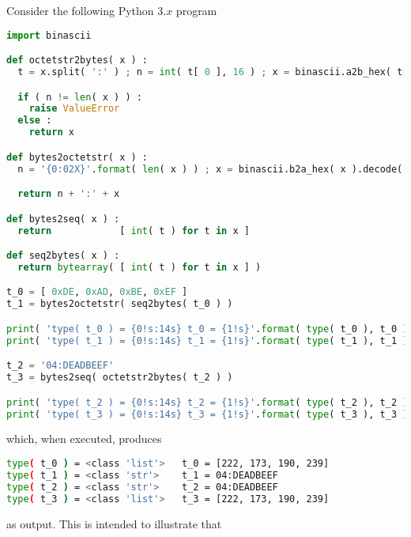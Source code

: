 Consider the following Python $3.x$ program

\begin{lstlisting}[language={Python},frame={single},basicstyle={\ttfamily\small}]
import binascii

def octetstr2bytes( x ) :
  t = x.split( ':' ) ; n = int( t[ 0 ], 16 ) ; x = binascii.a2b_hex( t[ 1 ] )

  if ( n != len( x ) ) :
    raise ValueError
  else :
    return x

def bytes2octetstr( x ) :
  n = '{0:02X}'.format( len( x ) ) ; x = binascii.b2a_hex( x ).decode( 'ascii' ).upper()

  return n + ':' + x

def bytes2seq( x ) :
  return            [ int( t ) for t in x ]

def seq2bytes( x ) :
  return bytearray( [ int( t ) for t in x ] )

t_0 = [ 0xDE, 0xAD, 0xBE, 0xEF ]
t_1 = bytes2octetstr( seq2bytes( t_0 ) )

print( 'type( t_0 ) = {0!s:14s} t_0 = {1!s}'.format( type( t_0 ), t_0 ) )
print( 'type( t_1 ) = {0!s:14s} t_1 = {1!s}'.format( type( t_1 ), t_1 ) )

t_2 = '04:DEADBEEF'
t_3 = bytes2seq( octetstr2bytes( t_2 ) )

print( 'type( t_2 ) = {0!s:14s} t_2 = {1!s}'.format( type( t_2 ), t_2 ) )
print( 'type( t_3 ) = {0!s:14s} t_3 = {1!s}'.format( type( t_3 ), t_3 ) )
\end{lstlisting}

\noindent
which, when executed, produces

\begin{lstlisting}[language={bash},  frame={single},basicstyle={\ttfamily\small}] 
type( t_0 ) = <class 'list'>   t_0 = [222, 173, 190, 239]
type( t_1 ) = <class 'str'>    t_1 = 04:DEADBEEF
type( t_2 ) = <class 'str'>    t_2 = 04:DEADBEEF
type( t_3 ) = <class 'list'>   t_3 = [222, 173, 190, 239]
\end{lstlisting}

\noindent
as output.  This is intended to illustrate that

